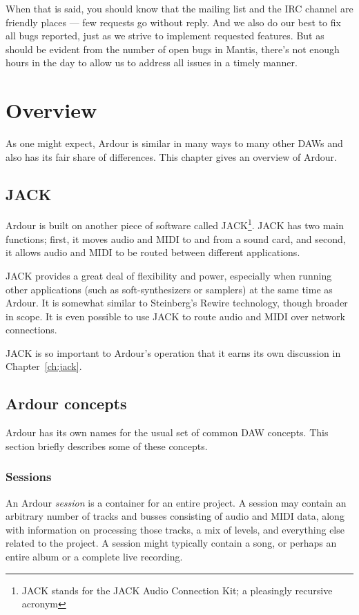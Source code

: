 \documentclass[10pt,a4paper]{book}
\begin{document}
When that is said, you should know that the mailing list and the IRC
channel are friendly places --- few requests go without reply. And we
also do our best to fix all bugs reported, just as we strive to
implement requested features. But as should be evident from the number
of open bugs in Mantis, there's not enough hours in the day to allow
us to address all issues in a timely manner.


\chapter{Overview}

As one might expect, Ardour is similar in many ways to many other DAWs
and also has its fair share of differences.  This chapter gives an
overview of Ardour.


\section{JACK}

Ardour is built on another piece of software called JACK\footnote{JACK
  stands for the JACK Audio Connection Kit; a pleasingly recursive acronym}.
JACK has two main functions; first, it moves audio and MIDI to
and from a sound card, and second, it allows audio and MIDI to be
routed between different applications.

JACK provides a great deal of flexibility and power, especially when
running other applications (such as soft-synthesizers or samplers) at
the same time as Ardour.  It is somewhat similar to Steinberg's Rewire
technology, though broader in scope.  It is even possible to use JACK
to route audio and MIDI over network connections.

JACK is so important to Ardour's operation that it earns its own
discussion in Chapter~\ref{ch:jack}.


\section{Ardour concepts}

Ardour has its own names for the usual set of common DAW concepts.
This section briefly describes some of these concepts.


\subsection{Sessions}

An Ardour \emph{session} is a container for an entire project.  A
session may contain an arbitrary number of tracks and busses
consisting of audio and MIDI data, along with information on processing
those tracks, a mix of levels, and everything else related to the
project.  A session might typically contain a song, or perhaps an entire
album or a complete live recording.
\end{document}
